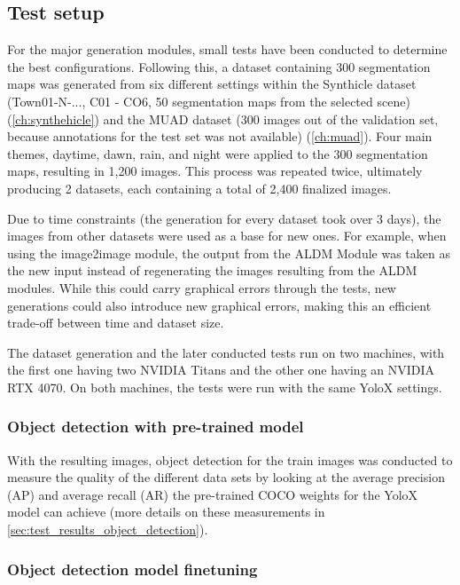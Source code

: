 \subsection{Test setup}

For the major generation modules, small tests have been conducted to determine the best configurations. Following this, a dataset containing 300 segmentation maps was generated from six different settings within the Synthicle dataset (Town01-N-..., C01 - CO6, 50 segmentation maps from the selected scene) (\autoref{ch:synthehicle}) and the MUAD dataset (300 images out of the validation set, because annotations for the test set was not available) (\autoref{ch:muad}). Four main themes, daytime, dawn, rain, and night were applied to the  300 segmentation maps, resulting in 1,200 images. This process was repeated twice, ultimately producing 2 datasets, each containing a total of 2,400 finalized images.

Due to time constraints (the generation for every dataset took over 3 days), the images from other datasets were used as a base for new ones. For example, when using the image2image module, the output from the ALDM Module was taken as the new input instead of regenerating the images resulting from the ALDM modules. While this could carry graphical errors through the tests, new generations could also introduce new graphical errors, making this an efficient trade-off between time and dataset size.

The dataset generation and the later conducted tests run on two machines, with the first one having two NVIDIA Titans and the other one having an NVIDIA RTX 4070. On both machines, the tests were run with the same YoloX settings.

\subsubsection{Object detection with pre-trained model}

With the resulting images, object detection for the train images was conducted to measure the quality of the different data sets by looking at the average precision (AP) and average recall (AR) the pre-trained COCO weights for the YoloX model can achieve (more details on these measurements in \autoref{sec:test_results_object_detection}). 

\subsubsection{Object detection model finetuning}

